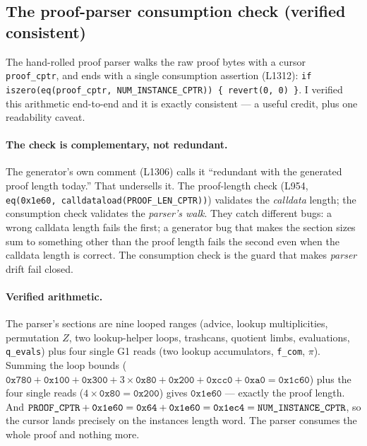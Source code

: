 \subsection{The proof-parser consumption check (verified consistent)}
\label{sec:pr-parser-consumption}

The hand-rolled proof parser walks the raw proof bytes with a
cursor \texttt{proof\_cptr}, and ends with a single
consumption assertion (L1312):
\texttt{if iszero(eq(proof\_\allowbreak{}cptr, NUM\_\allowbreak{}INSTANCE\_\allowbreak{}CPTR)) \{
revert(0, 0) \}}. I verified this arithmetic end-to-end and it
is exactly consistent --- a useful credit, plus one readability
caveat.

\paragraph{The check is complementary, not redundant.}
The generator's own comment (L1306) calls it ``redundant with
the generated proof length today.'' That undersells it. The
proof-length check (L954, \texttt{eq(0x1e60,
calldataload(PROOF\_\allowbreak{}LEN\_\allowbreak{}CPTR))}) validates the \emph{calldata}
length; the consumption check validates the \emph{parser's walk}.
They catch different bugs: a wrong calldata length fails the
first; a generator bug that makes the section sizes sum to
something other than the proof length fails the second even when
the calldata length is correct. The consumption check is the
guard that makes \emph{parser} drift fail closed.

\paragraph{Verified arithmetic.}
The parser's sections are nine looped ranges (advice, lookup
multiplicities, permutation $Z$, two lookup-helper loops, trashcans,
quotient limbs, evaluations, \texttt{q\_evals}) plus four single G1
reads (two lookup accumulators, \texttt{f\_com}, $\pi$). Summing the loop bounds
($\texttt{0x780}+\texttt{0x100}+\texttt{0x300}+3\times\texttt{0x80}
+\texttt{0x200}+\texttt{0xcc0}+\texttt{0xa0} = \texttt{0x1c60}$)
plus the four single reads
($4\times\texttt{0x80}=\texttt{0x200}$) gives
$\texttt{0x1e60}$ --- exactly the proof length. And
$\texttt{PROOF\_CPTR} + \texttt{0x1e60} =
\texttt{0x64} + \texttt{0x1e60} = \texttt{0x1ec4} =
\texttt{NUM\_\allowbreak{}INSTANCE\_\allowbreak{}CPTR}$, so the cursor lands precisely on
the instances length word. The parser consumes the whole proof
and nothing more.


